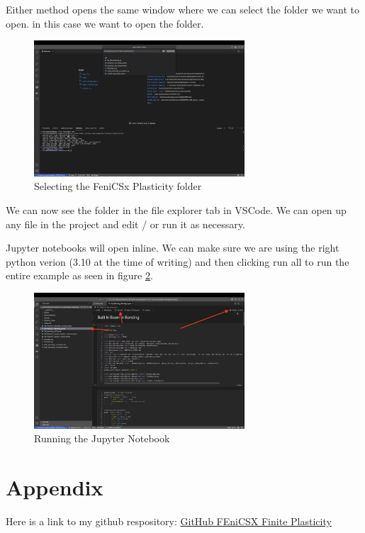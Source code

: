 \documentclass[final]{article}
\numberwithin{equation}{section}
\theoremstyle{remarkStyle}
\begin{document}
Either method opens the same window where we can select the folder we want to open.
in this case we want to open the  folder.
\begin{figure}[H]
  \centering
  \includegraphics[width=0.7\textwidth]{Open-Folder-accept.png}
  \caption{Selecting the FeniCSx Plasticity folder }%
  \label{fig:vsDocker-Open-Folder-Accept}%
\end{figure}

We can now see the folder in the file explorer tab in VSCode. We can open up any file in the project and edit / or run it as necessary.

Jupyter notebooks will open inline. We can make sure we are using the right python verion (3.10 at the time of writing) and then clicking run all to run the entire example as seen in figure \ref{fig:Project_Open}.
\begin{figure}[H]
  \centering
  \includegraphics[width=0.7\textwidth]{VSCode-ProjectOpen.png}
  \caption{Running the Jupyter Notebook }%
  \label{fig:Project_Open}%
\end{figure}


\section{Appendix}
Here is a link to my github respository:
\href{https://github.com/jorgenin/2.077-FEniCSx-Finite-Elasticity}{GitHub FEniCSX Finite Plasticity}
\end{document}
